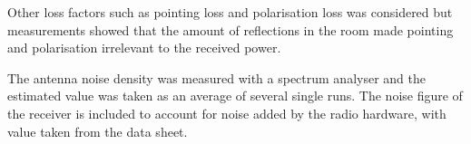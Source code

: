  Other loss factors such as pointing loss and polarisation loss was considered but measurements showed that the amount of reflections in the room made pointing and polarisation irrelevant to the received power. 
 
The antenna noise density was measured with a spectrum analyser and the estimated value was taken as an average of several single runs. The noise figure of the receiver is included to account for noise added by the radio hardware, with value taken from the data sheet. 

%
%



